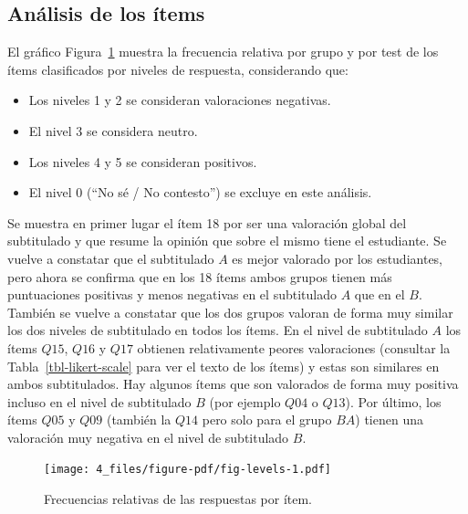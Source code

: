 \documentclass[
  12pt,
  a4paper,
  extrafontsizes,
  onecolumn,
  openright,
  table]{memoir}
\providecommand{\tightlist}{%
  \setlength{\itemsep}{0pt}\setlength{\parskip}{0pt}}\usepackage{longtable,booktabs,array}
\begin{document}
\hypertarget{anuxe1lisis-de-los-uxedtems}{%
\subsection{Análisis de los ítems}\label{anuxe1lisis-de-los-uxedtems}}

El gráfico Figura~\ref{fig-levels} muestra la frecuencia relativa por
grupo y por test de los ítems clasificados por niveles de respuesta,
considerando que:

\begin{itemize}
\tightlist
\item
  Los niveles 1 y 2 se consideran valoraciones negativas.
\item
  El nivel 3 se considera neutro.
\item
  Los niveles 4 y 5 se consideran positivos.
\item
  El nivel 0 (\enquote{No sé / No contesto}) se excluye en este
  análisis.
\end{itemize}

Se muestra en primer lugar el ítem 18 por ser una valoración global del
subtitulado y que resume la opinión que sobre el mismo tiene el
estudiante. Se vuelve a constatar que el subtitulado \(A\) es mejor
valorado por los estudiantes, pero ahora se confirma que en los 18 ítems
ambos grupos tienen más puntuaciones positivas y menos negativas en el
subtitulado \(A\) que en el \(B\). También se vuelve a constatar que los
dos grupos valoran de forma muy similar los dos niveles de subtitulado
en todos los ítems. En el nivel de subtitulado \(A\) los ítems \(Q15\),
\(Q16\) y \(Q17\) obtienen relativamente peores valoraciones (consultar
la Tabla~\ref{tbl-likert-scale} para ver el texto de los ítems) y estas
son similares en ambos subtitulados. Hay algunos ítems que son valorados
de forma muy positiva incluso en el nivel de subtitulado \(B\) (por
ejemplo \(Q04\) o \(Q13\)). Por último, los ítems \(Q05\) y \(Q09\)
(también la \(Q14\) pero solo para el grupo \(BA\)) tienen una
valoración muy negativa en el nivel de subtitulado \(B\).

\begin{figure}[h]

{\centering \texttt{[image: 4\_files/figure-pdf/fig-levels-1.pdf]}

}

\caption{\label{fig-levels}Frecuencias relativas de las respuestas por
ítem.}

\end{figure}
\end{document}
